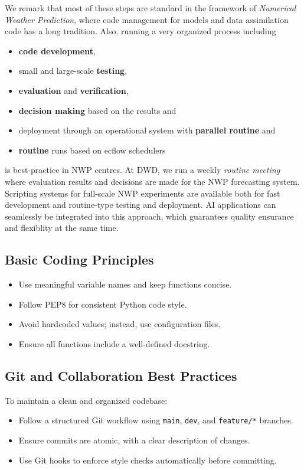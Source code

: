 We remark that most of these steps are standard in the framework of \emph{Numerical Weather Prediction}, where code management for models and data assimilation code has a long tradition. Also, running a very organized process including
\begin{itemize}[itemsep=1pt,topsep=3pt]
\item \textbf{code development},  
\item small and large-scale \textbf{testing}, 
\item \textbf{evaluation} and \textbf{verification}, 
\item \textbf{decision making} based on the results and 
\item deployment through an operational system with \textbf{parallel routine} and 
\item \textbf{routine} runs based on ecflow schedulers 
\end{itemize}
is best-practice in NWP centres. At DWD, we run a weekly \emph{routine meeting} where evaluation results and decisions are made for the NWP forecasting system. Scripting systems for full-scale NWP experiments are available both for fast development and routine-type testing and deployment. AI applications can seamlessly be integrated into this approach, which guarantees quality ensurance and flexiblity at the same time. 

\subsection{Basic Coding Principles}
\begin{itemize}[itemsep=1pt,topsep=3pt]
    \item Use meaningful variable names and keep functions concise.
    \item Follow PEP8 for consistent Python code style.
    \item Avoid hardcoded values; instead, use configuration files.
    \item Ensure all functions include a well-defined docstring.
\end{itemize}

\subsection{Git and Collaboration Best Practices}
To maintain a clean and organized codebase:

\begin{itemize}[itemsep=1pt,topsep=3pt]
    \item Follow a structured Git workflow using \texttt{main}, \texttt{dev}, and \texttt{feature/*} branches.
    \item Ensure commits are atomic, with a clear description of changes.
    \item Use Git hooks to enforce style checks automatically before committing.
\end{itemize}

